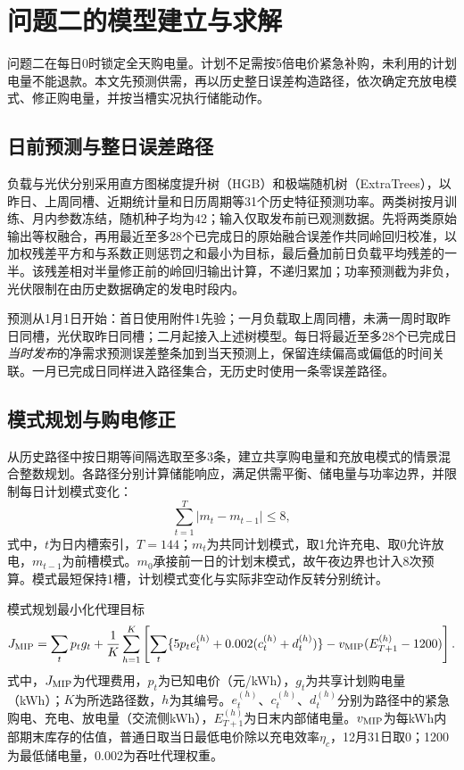 \section{问题二的模型建立与求解}
\label{sec:q2-prediction}
问题二在每日0时锁定全天购电量。计划不足需按5倍电价紧急补购，未利用的计划电量不能退款。本文先预测供需，再以历史整日误差构造路径，依次确定充放电模式、修正购电量，并按当槽实况执行储能动作。

\subsection{日前预测与整日误差路径}
负载与光伏分别采用直方图梯度提升树（HGB）和极端随机树（ExtraTrees），以昨日、上周同槽、近期统计量和日历周期等31个历史特征预测功率。两类树按月训练、月内参数冻结，随机种子均为42；输入仅取发布前已观测数据。先将两类原始输出等权融合，再用最近至多28个已完成日的原始融合误差作共同岭回归校准，以加权残差平方和与系数正则惩罚之和最小为目标，最后叠加前日负载平均残差的一半。该残差相对半量修正前的岭回归输出计算，不递归累加；功率预测截为非负，光伏限制在由历史数据确定的发电时段内。

预测从1月1日开始：首日使用附件1先验；一月负载取上周同槽，未满一周时取昨日同槽，光伏取昨日同槽；二月起接入上述树模型。每日将最近至多28个已完成日\emph{当时发布}的净需求预测误差整条加到当天预测上，保留连续偏高或偏低的时间关联。一月已完成日同样进入路径集合，无历史时使用一条零误差路径。

\subsection{模式规划与购电修正}
从历史路径中按日期等间隔选取至多3条，建立共享购电量和充放电模式的情景混合整数规划。各路径分别计算储能响应，满足供需平衡、储电量与功率边界，并限制每日计划模式变化：
\begin{equation}\label{eq:q2-mode-budget}
 \sum_{t=1}^{T}|m_t-m_{t-1}|\leq8,
\end{equation}
式中，$t$为日内槽索引，$T=144$；$m_t$为共同计划模式，取1允许充电、取0允许放电，$m_{t-1}$为前槽模式。$m_0$承接前一日的计划末模式，故午夜边界也计入8次预算。模式最短保持1槽，计划模式变化与实际非空动作反转分别统计。

模式规划最小化代理目标
\begin{equation}\label{eq:q2-plan-objective}
 J_{\rm MIP}=\sum_tp_tg_t+
 \frac1K\sum_{h=1}^{K}\left[
 \sum_t\{5p_te_t^{(h)}+0.002(c_t^{(h)}+d_t^{(h)})\}
 -v_{\rm MIP}(E_{T+1}^{(h)}-1200)\right].
\end{equation}
式中，$J_{\rm MIP}$为代理费用，$p_t$为已知电价（元/kWh），$g_t$为共享计划购电量（kWh）；$K$为所选路径数，$h$为其编号。$e_t^{(h)}$、$c_t^{(h)}$、$d_t^{(h)}$分别为路径中的紧急购电、充电、放电量（交流侧kWh），$E_{T+1}^{(h)}$为日末内部储电量。$v_{\rm MIP}$为每kWh内部期末库存的估值，普通日取当日最低电价除以充电效率$\eta_c$，12月31日取0；1200为最低储电量，0.002为吞吐代理权重。

